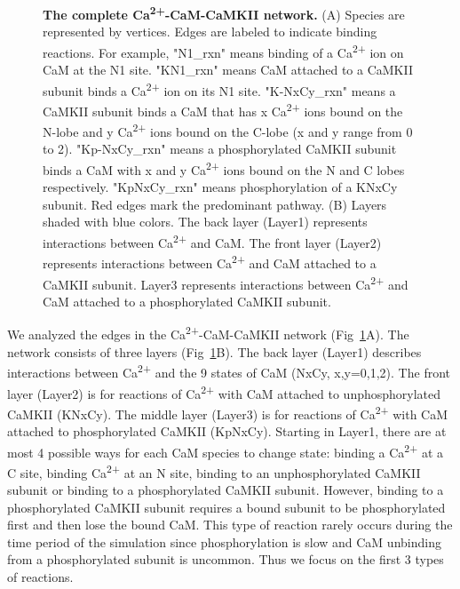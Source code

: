 \documentclass[10pt,letterpaper]{article}
\begin{document}
\begin{figure}[!h]
	\caption{{\bf The complete Ca\textsuperscript{2+}-CaM-CaMKII network.}
	(A) Species are represented by vertices. Edges are labeled to indicate binding reactions. For example, "N1\_rxn" means binding of a Ca\textsuperscript{2+} ion on CaM at the N1 site. "KN1\_rxn" means CaM attached to a CaMKII subunit binds a Ca\textsuperscript{2+} ion on its N1 site. "K-NxCy\_rxn" means a CaMKII subunit binds a CaM that has x Ca\textsuperscript{2+} ions bound on the N-lobe and y Ca\textsuperscript{2+} ions bound on the C-lobe (x and y range from 0 to 2). "Kp-NxCy\_rxn" means a phosphorylated CaMKII subunit binds a CaM with x and y Ca\textsuperscript{2+} ions bound on the N and C lobes respectively. "KpNxCy\_rxn" means phosphorylation of a KNxCy subunit. Red edges mark the predominant pathway. 
	(B) Layers shaded with blue colors. The back layer (Layer1) represents interactions between Ca\textsuperscript{2+} and CaM. The front layer (Layer2) represents interactions between Ca\textsuperscript{2+} and CaM attached to a CaMKII subunit. Layer3 represents interactions between Ca\textsuperscript{2+} and CaM attached to a phosphorylated CaMKII subunit.
	}
\label{fig2}
\end{figure}

We analyzed the edges in the Ca\textsuperscript{2+}-CaM-CaMKII network (Fig~\ref{fig2}A). The network consists of three layers (Fig~\ref{fig2}B). The back layer (Layer1) describes interactions between Ca\textsuperscript{2+} and the 9 states of CaM (NxCy, x,y=0,1,2). The front layer (Layer2) is for reactions of Ca\textsuperscript{2+} with CaM attached to unphosphorylated CaMKII (KNxCy). The middle layer (Layer3) is for reactions of Ca\textsuperscript{2+} with CaM attached to phosphorylated CaMKII (KpNxCy). Starting in Layer1, there are at most 4 possible ways for each CaM species to change state: binding a Ca\textsuperscript{2+} at a C site, binding Ca\textsuperscript{2+} at an N site, binding to an unphosphorylated CaMKII subunit or binding to a phosphorylated CaMKII subunit. However, binding to a phosphorylated CaMKII subunit requires a bound subunit to be phosphorylated first and then lose the bound CaM. This type of reaction rarely occurs during the time period of the simulation since phosphorylation is slow and CaM unbinding from a phosphorylated subunit is uncommon. Thus we focus on the first 3 types of reactions.
\end{document}

